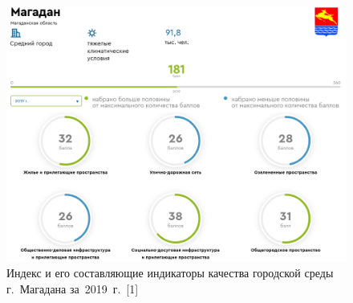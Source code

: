 \begin{figure}[h!]
  \begin{center}
    \includegraphics[width=1\textwidth]{authors/kodirev-fig-1.png}
  \end{center}
  \caption{Индекс и его составляющие индикаторы качества городской среды г.~Магадана за~2019~г.~[1]}
  \label{fig:kodirev-fig-1}
\end{figure}
